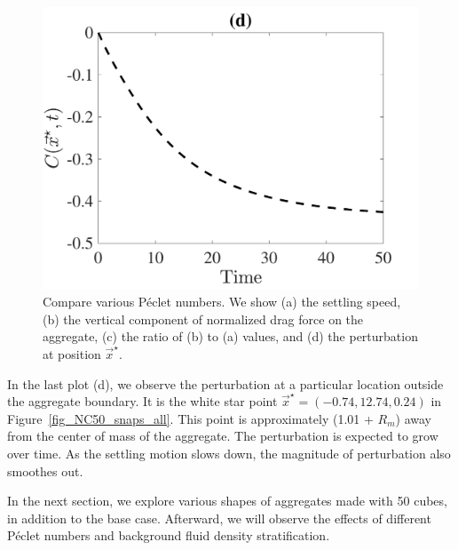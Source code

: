 \begin{figure}[ht]
\begin{center}
		\includegraphics[scale=0.35]{./figures/fig_NC50_bs_C_star}
	\caption{Compare various Péclet numbers. We show (a) the settling speed, (b) the vertical component of normalized drag force on the aggregate, (c) the ratio of (b) to (a) values, and (d) the perturbation at position $\vec{x}^{\star}$. }
	\label{fig_NC50_base_case_all}
\end{center}
\end{figure}
\par
In the last plot (d), we observe the perturbation at a particular location outside the aggregate boundary. It is the white star point $\vec{x}^{\star} = (-0.74, 12.74, 0.24)$ in Figure~\ref{fig_NC50_snaps_all}. This point is approximately (1.01 + $R_m$) away from the center of mass of the aggregate. The perturbation is expected to grow over time. As the settling motion slows down, the magnitude of perturbation also smoothes out. 
\par
In the next section, we explore various shapes of aggregates made with 50 cubes, in addition to the base case. Afterward, we will observe the effects of different Péclet numbers and background fluid density stratification. 
